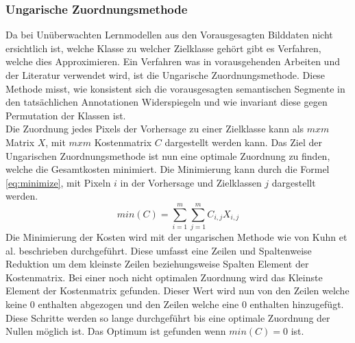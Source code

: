 \subsubsection{Ungarische Zuordnungsmethode}

Da bei Unüberwachten Lernmodellen aus den Vorausgesagten Bilddaten nicht ersichtlich ist, welche Klasse zu welcher Zielklasse gehört gibt es Verfahren, welche dies Approximieren. Ein Verfahren was in vorausgehenden Arbeiten und der Literatur verwendet wird, ist die Ungarische Zuordnungsmethode.\cite{hungarian_Kuhn_1955}
Diese Methode misst, wie konsistent sich die vorausgesagten semantischen Segmente in den tatsächlichen Annotationen Widerspiegeln und wie invariant diese gegen Permutation der Klassen ist.\\
Die Zuordnung jedes Pixels der Vorhersage zu einer Zielklasse kann als $m x m$ Matrix $X$, mit $m x m$ Kostenmatrix $C$ dargestellt werden kann. Das Ziel der Ungarischen Zuordnungsmethode ist nun eine optimale Zuordnung zu finden, welche die Gesamtkosten minimiert.
Die Minimierung kann durch die Formel \ref{eq:minimize}, mit Pixeln $i$ in der Vorhersage und Zielklassen $j$ dargestellt werden. 
\begin{equation}
   min(C) = \sum_{i=1}^{m}\sum_{j=1}^{m}{C_{i,j}X_{i,j}}
   \label{eq:minimize}
\end{equation}
 Die Minimierung der Kosten wird mit der ungarischen Methode wie von Kuhn et al. \cite{hungarian_Kuhn_1955} beschrieben durchgeführt. Diese umfasst eine Zeilen und Spaltenweise Reduktion um dem kleinste Zeilen beziehungsweise Spalten Element der Kostenmatrix. Bei einer noch nicht optimalen Zuordnung wird das Kleinste Element der Kostenmatrix gefunden. Dieser Wert wird nun von den Zeilen welche keine 0 enthalten abgezogen und den Zeilen welche eine 0 enthalten hinzugefügt. Diese Schritte werden so lange durchgeführt bis eine optimale Zuordnung der Nullen möglich ist. Das Optimum ist gefunden wenn $ min(C) = 0$ ist. 
